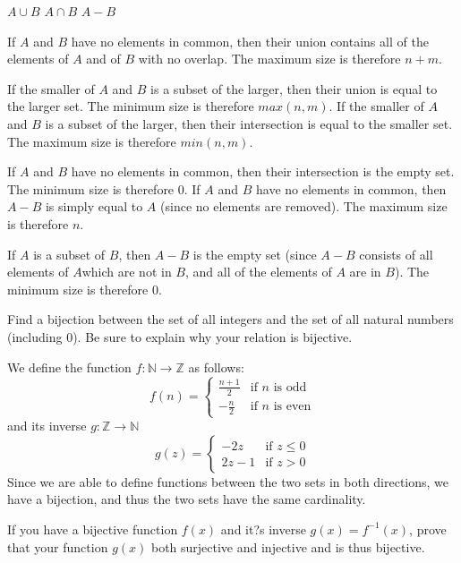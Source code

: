 \documentclass[solution, letterpaper]{cs20}
\begin{document}
\subproblem $A \cup B$
\subproblem $A \cap B$
\subproblem $A - B$
 
\begin{solution}
\subsolution If $A$ and $B$ have no elements in common, then their union contains all of the elements of $A$ and of $B$ with no overlap. The maximum size is therefore $n + m$. 

\noindent If the smaller of $A$ and $B$ is a subset of the larger, then their union is equal to the larger set. The minimum size is therefore $max(n, m)$.
\subsolution If the smaller of $A$ and $B$ is a subset of the larger, then their intersection is equal to the smaller set. The maximum size is therefore $min(n, m)$.

\noindent If $A$ and $B$ have no elements in common, then their intersection is the empty set. The minimum size is therefore 0.
\subsolution If $A$ and $B$ have no elements in common, then $A - B$ is simply equal to $A$ (since no elements are removed). The maximum size is therefore $n$.

\noindent If $A$ is a subset of $B$, then $A - B$ is the empty set (since $A - B$ consists of all elements of $A$which are not in $B$, and all of the elements of $A$ are in $B$). The minimum size is therefore 0.
\end{solution}

Find a bijection between the set of all integers and the set of all natural numbers (including 0). Be sure to explain why your relation is bijective.

\begin{solution}
We define the function $f:\mathbb{N} \to \mathbb{Z}$ as follows: 
$$f(n) = \begin{cases} \frac{n+1}{2} & \mbox{if }n\mbox{ is odd} \\ -\frac{n}{2} & \mbox{if }n\mbox{ is even} \end{cases}$$
and its inverse $g:\mathbb{Z} \to \mathbb{N}$
$$g(z) = \begin{cases} -2z & \mbox{if }z \leq 0 \\ 2z-1& \mbox{if }z > 0 \end{cases}$$
Since we are able to define functions between the two sets in both directions, we have a bijection, and thus the two sets have the same cardinality.
\end{solution}
 
 
If you have a bijective function $f(x)$ and it?s inverse $g(x) = f^{-1}(x)$, prove that your function $g(x)$ both surjective and injective and is thus bijective.
\end{document}
